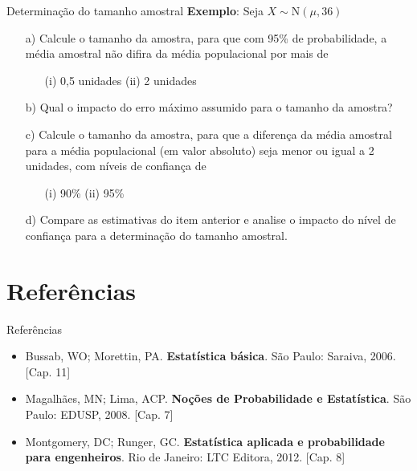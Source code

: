 \documentclass[10pt]{beamer}\usepackage[]{graphicx}\usepackage[]{color}
\theoremstyle{definition}
\begin{document}
\begin{frame}{Determinação do tamanho amostral}
  \textbf{Exemplo}: Seja $X \sim \text{N}(\mu,36)$
  \begin{itemize}
  \item[a)] Calcule o tamanho da amostra, para que com 95\% de
    probabilidade, a média amostral não difira da média populacional por
    mais de
    \begin{itemize}
    \item[] (i) 0,5 unidades \quad (ii) 2 unidades
    \end{itemize}
  \item[b)] Qual o impacto do erro máximo assumido para o tamanho da
    amostra?
  \item[c)] Calcule o tamanho da amostra, para que a diferença da média
    amostral para a média populacional (em valor absoluto) seja menor ou
    igual a 2 unidades, com níveis de confiança de
    \begin{itemize}
    \item[] (i) 90\% \quad (ii) 95\%
    \end{itemize}
  \item[d)] Compare as estimativas do item anterior e analise o impacto
    do nível de confiança para a determinação do tamanho amostral.
  \end{itemize}
\end{frame}

\section{Referências}

\begin{frame}{Referências}
  \begin{itemize}
  \item Bussab, WO; Morettin, PA. \textbf{Estatística básica}. São
    Paulo: Saraiva, 2006. [Cap. 11]
  \item Magalhães, MN; Lima, ACP. \textbf{Noções de Probabilidade e
      Estatística}. São Paulo: EDUSP, 2008. [Cap. 7]
  \item Montgomery, DC; Runger, GC. \textbf{Estatística aplicada e
      probabilidade para engenheiros}. Rio de Janeiro: LTC Editora,
    2012. [Cap. 8]
  \end{itemize}
\end{frame}
\end{document}
